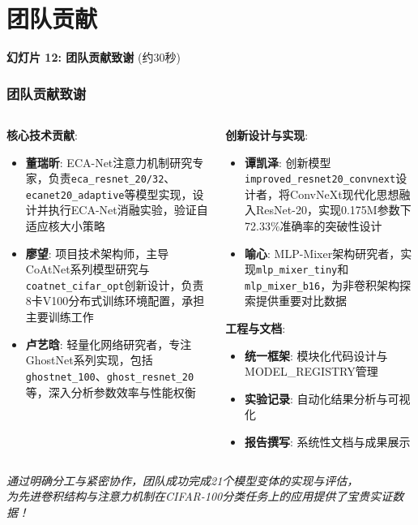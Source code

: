 \documentclass[10pt]{beamer}
\begin{document}
\section{团队贡献}
\begin{frame}{\textbf{幻灯片 12: 团队贡献致谢} (约30秒)}
\frametitle{团队贡献致谢}

\begin{columns}[T]
    \begin{column}{0.48\textwidth}
        \textbf{核心技术贡献}:
        \begin{itemize}
            \item \textbf{董瑞昕}: ECA-Net注意力机制研究专家，负责\texttt{eca\_resnet\_20/32}、\texttt{ecanet20\_adaptive}等模型实现，设计并执行ECA-Net消融实验，验证自适应核大小策略
            \item \textbf{廖望}: 项目技术架构师，主导CoAtNet系列模型研究与\texttt{coatnet\_cifar\_opt}创新设计，负责8卡V100分布式训练环境配置，承担主要训练工作
            \item \textbf{卢艺晗}: 轻量化网络研究者，专注GhostNet系列实现，包括\texttt{ghostnet\_100}、\texttt{ghost\_resnet\_20}等，深入分析参数效率与性能权衡
        \end{itemize}
    \end{column}
    \begin{column}{0.48\textwidth}
        \textbf{创新设计与实现}:
        \begin{itemize}
            \item \textbf{谭凯泽}: 创新模型\texttt{improved\_resnet20\_convnext}设计者，将ConvNeXt现代化思想融入ResNet-20，实现0.175M参数下72.33\%准确率的突破性设计
            \item \textbf{喻心}: MLP-Mixer架构研究者，实现\texttt{mlp\_mixer\_tiny}和\texttt{mlp\_mixer\_b16}，为非卷积架构探索提供重要对比数据
        \end{itemize}
        
        \vspace{0.5em}
        \textbf{工程与文档}:
        \begin{itemize}
            \item \textbf{统一框架}: 模块化代码设计与MODEL\_REGISTRY管理
            \item \textbf{实验记录}: 自动化结果分析与可视化
            \item \textbf{报告撰写}: 系统性文档与成果展示
        \end{itemize}
    \end{column}
\end{columns}

\vspace{0.8em}
\centering
\textit{通过明确分工与紧密协作，团队成功完成21个模型变体的实现与评估，\\
为先进卷积结构与注意力机制在CIFAR-100分类任务上的应用提供了宝贵实证数据！}

\end{frame}
\end{document}
